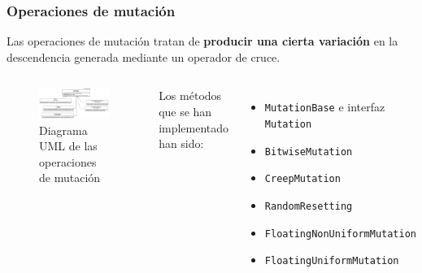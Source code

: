 \documentclass{beamer}
\begin{document}
\begin{frame}
\frametitle{Operaciones de mutación}

Las operaciones de mutación tratan de \textbf{producir una cierta variación} en la descendencia generada mediante un operador de cruce.

\bigskip

\begin{columns}
    \begin{figure}
        \centering
        \includegraphics[width=\textwidth]{mem/images/cap-4/4.2.7(Mutation)/Mutation.png}
        \caption{Diagrama UML de las operaciones de mutación}
        \label{fig:my_label}
    \end{figure}
    Los métodos que se han implementado han sido:
    \begin{itemize}
        \item \texttt{MutationBase} e interfaz \texttt{Mutation}
        \item \texttt{BitwiseMutation}
        \item \texttt{CreepMutation}
        \item \texttt{RandomResetting}
        \item \texttt{FloatingNonUniformMutation}
        \item \texttt{FloatingUniformMutation}
    \end{itemize}
\end{columns}

\end{frame}
\end{document}
